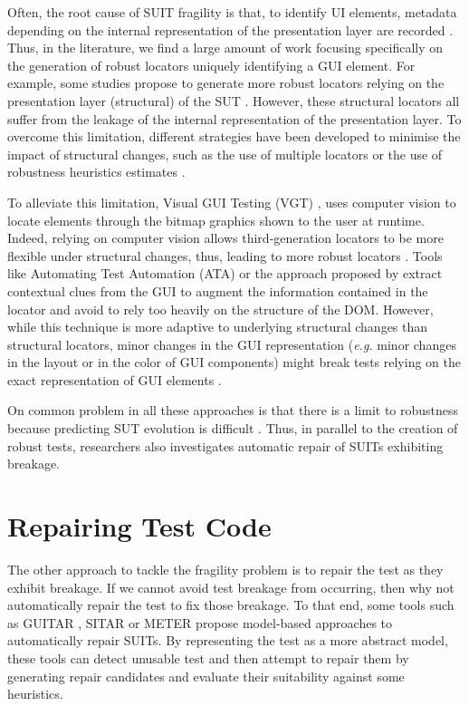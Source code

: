 Often, the root cause of SUIT fragility is that, to identify UI elements, metadata depending on the internal representation of the presentation layer are recorded \cite{Daniel2011, Yandrapally2014, Hammoudi2016}. Thus, in the literature, we find a large amount of work focusing specifically on the generation of robust locators uniquely identifying a GUI element. For example, some studies propose to generate more robust locators relying on the presentation layer (structural) of the SUT \cite{Montoto2011, Leotta2014, Leotta2015, Leotta2016, Zheng2018}. However, these structural locators all suffer from the leakage of the internal representation of the presentation layer. To overcome this limitation, different strategies have been developed to minimise the impact of structural changes, such as the use of multiple locators \cite{Leotta2015, Zheng2018, Long2020} or the use of robustness heuristics estimates \cite{Montoto2011, Leotta2014, Leotta2015, Leotta2015b}.

To alleviate this limitation, Visual GUI Testing (VGT) \cite{Bosch2014}, uses computer vision to locate elements through the bitmap graphics shown to the user at runtime. Indeed, relying on computer vision allows third-generation locators to be more flexible under structural changes, thus, leading to more robust locators \cite{Leotta2014b}. Tools like  Automating Test Automation (ATA) \cite{Thummalapenta2012, Thummalapenta2013} or the approach proposed by \textcite{Yandrapally2014} extract contextual clues from the GUI to augment the information contained in the locator and avoid to rely too heavily on the structure of the DOM. However, while this technique is more adaptive to underlying structural changes than structural locators, minor changes in the GUI representation (\emph{e.g.} minor changes in the layout or in the color of GUI components) might break tests relying on the exact representation of GUI elements \cite{Aldalur2017, Alegroth2018}.

On common problem in all these approaches is that there is a limit to robustness because predicting SUT evolution is difficult \cite{Kirinuki2019}. Thus, in parallel to the creation of robust tests, researchers also investigates automatic repair of SUITs exhibiting breakage.

\section{Repairing Test Code}
\label{sec:related-repair}

The other approach to tackle the fragility problem is to repair the test as they exhibit breakage. If we cannot avoid test breakage from occurring, then why not automatically repair the test to fix those breakage. To that end, some tools such as GUITAR \cite{Memon2008}, SITAR \cite{Gao2016} or METER \cite{Pan2020} propose model-based approaches to automatically repair SUITs. By representing the test as a more abstract model, these tools can detect unusable test and then attempt to repair them by generating repair candidates and evaluate their suitability against some heuristics.


